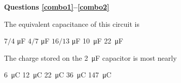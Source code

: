 \documentclass{../../oss-classkick-exam}
\begin{document}
\genheader


\genmultidirections

\begin{multicols*}{2}
  \textbf{Questions \ref{combo1}--\ref{combo2}}
  \begin{center}
  \end{center}
  
  \begin{questions}
  \question The equivalent capacitance of this circuit is
  \label{combo1}
  \begin{choices}
    \choice $7/4$ \si{\micro\farad}
    \choice $4/7$ \si{\micro\farad}
    \choice $16/13$ \si{\micro\farad}
    \choice\SI{10}{\micro\farad}
    \choice\SI{22}{\micro\farad}
  \end{choices}
  
  \question The charge stored on the \SI{2}{\micro\farad} capacitor is most
  nearly
  \label{combo2}
  \begin{choices}
    \choice\SI{6}{\micro\coulomb}
    \choice\SI{12}{\micro\coulomb}
    \choice\SI{22}{\micro\coulomb}
    \choice\SI{36}{\micro\coulomb}
    \choice\SI{147}{\micro\coulomb}
  \end{choices}

\end{questions}
\end{multicols*}
\end{document}

